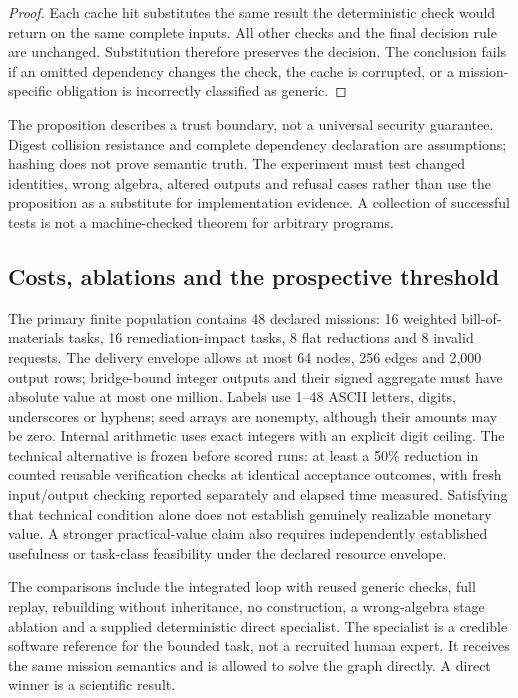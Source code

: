 \documentclass[11pt]{article}
\begin{document}
\begin{proof}
Each cache hit substitutes the same result the deterministic check would return on the same complete inputs. All other checks and the final decision rule are unchanged. Substitution therefore preserves the decision. The conclusion fails if an omitted dependency changes the check, the cache is corrupted, or a mission-specific obligation is incorrectly classified as generic.
\end{proof}

The proposition describes a trust boundary, not a universal security guarantee. Digest collision resistance and complete dependency declaration are assumptions; hashing does not prove semantic truth. The experiment must test changed identities, wrong algebra, altered outputs and refusal cases rather than use the proposition as a substitute for implementation evidence. A collection of successful tests is not a machine-checked theorem for arbitrary programs.

\subsection{Costs, ablations and the prospective threshold}

The primary finite population contains 48 declared missions: 16 weighted bill-of-materials tasks, 16 remediation-impact tasks, 8 flat reductions and 8 invalid requests. The delivery envelope allows at most 64 nodes, 256 edges and 2,000 output rows; bridge-bound integer outputs and their signed aggregate must have absolute value at most one million. Labels use 1--48 ASCII letters, digits, underscores or hyphens; seed arrays are nonempty, although their amounts may be zero. Internal arithmetic uses exact integers with an explicit digit ceiling. The technical alternative is frozen before scored runs: at least a 50\% reduction in counted reusable verification checks at identical acceptance outcomes, with fresh input/output checking reported separately and elapsed time measured. Satisfying that technical condition alone does not establish genuinely realizable monetary value. A stronger practical-value claim also requires independently established usefulness or task-class feasibility under the declared resource envelope.

The comparisons include the integrated loop with reused generic checks, full replay, rebuilding without inheritance, no construction, a wrong-algebra stage ablation and a supplied deterministic direct specialist. The specialist is a credible software reference for the bounded task, not a recruited human expert. It receives the same mission semantics and is allowed to solve the graph directly. A direct winner is a scientific result.
\end{document}
